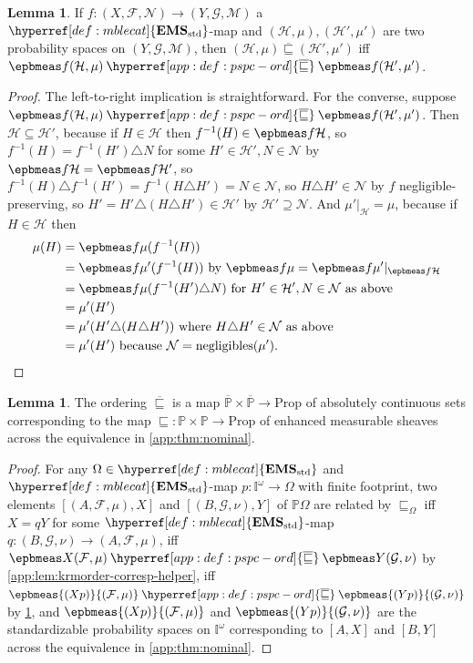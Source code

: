 \documentclass[
  sigconf,
  screen, ]{acmart}
\theoremstyle{definition}
\newtheorem{lemma}[theorem]{Lemma}
\newcommand\calF{\mathcal F}
\newcommand\calG{\mathcal G}
\newcommand\calH{\mathcal H}
\newcommand\calM{\mathcal M}
\newcommand\calN{\mathcal N}
\newcommand\nref[2]{\hyperref[#1]{#2}} \newcommand\checkhigh{{\huge{\color{red}\textbf{TODO: check}}}}
\newcommand\negligibles{\mathrm{negligibles}}
\newcommand\texhcube{{{{\mathbb I}^\omega}}}
\newcommand\hcube{{\nref{def:hcube}{\texhcube}}}
\newcommand\texagoodname{absolutely continuous set}
\newcommand\agoodname{\texagoodname}
\newcommand\sheafcatadj{enhanced measurable}
\newcommand\texgoodsheaves{\sheafcatadj{} sheaves}
\newcommand\goodsheaves{\texgoodsheaves}
\newcommand\texStdMble{\mathbf{EMS}_{\rm std}}
\newcommand\StdMble{{\nref{def:mblecat}{\texStdMble}}}
\newcommand\Prop{{\nref{prop:ext-ren-inv-prop}{\mathrm{Prop}}}}
\newcommand\texpspcs{\mathbb P}
\newcommand\pspcs{{\nref{def:mble-pspcs}{\texpspcs}}}
\newcommand\gkrmorder{\mathbin{\nref{app:def:pspc-ord}{\overline{\sqsubseteq}}}}
\newcommand\texgpspcs{\overline{\mathbb P}}
\newcommand\gpspcs{{\nref{def:gpspcs}{\texgpspcs}}}
\newcommand\krmorder{\mathrel{\nref{app:def:mble-pspcs-ordering}{\sqsubseteq}}}
\begin{document}
\begin{lemma} \label{app:epb-resp-ord}
  If $f : (X,\calF,\calN)\to(Y,\calG,\calM)$
  a $\StdMble$-map
  and $(\calH,\mu),(\calH',\mu')$
  are two probability spaces on $(Y,\calG,\calM)$,
  then $(\calH,\mu)\gkrmorder(\calH',\mu')$
  iff $\epbmeas f{(\calH,\mu)}\gkrmorder\epbmeas f{(\calH',\mu')}$.
\end{lemma}
\begin{proof}
  The left-to-right implication is straightforward.
  For the converse, suppose
 $\epbmeas f{(\calH,\mu)}\gkrmorder\epbmeas f{(\calH',\mu')}$.
  Then $\calH\subseteq\calH'$,
  because if $H\in\calH$
  then $f^{-1}(H)\in\epbmeas f\calH$,
  so $f^{-1}(H) = f^{-1}(H')\triangle N$
  for some $H'\in\calH',N\in\calN$
  by $\epbmeas f\calH=\epbmeas f{\calH'}$,
  so $f^{-1}(H)\triangle f^{-1}(H')
  =f^{-1}(H\triangle H')=N\in\calN$,
  so $H\triangle H'\in\calN$ by $f$ negligible-preserving,
  so $H' = H'\triangle(H\triangle H')\in\calH'$
  by $\calH'\supseteq\calN$.
  And $\mu'|_\calH = \mu$,
  because if $H\in\calH$
  then \begin{align*}
    \mu(H)
     &= \epbmeas f\mu(f^{-1}(H)) \\
     &= \epbmeas f{\mu'}(f^{-1}(H)) \text{ by $\epbmeas f\mu=\epbmeas f{\mu'}|_{\epbmeas f{\calH}}$}\\
     &= \epbmeas f{\mu}(f^{-1}(H')\triangle N) \text{ for $H'\in\calH',N\in\calN$ as above} \\
     &= \mu'(H') \\
     &= \mu'(H'\triangle(H\triangle H')) \text{ where $H\triangle H'\in\calN$ as above}\\
     &= \mu'(H') \text{ because $\calN=\negligibles(\mu')$}.
  \end{align*}
\end{proof}

\begin{lemma} \label{app:lem:krmorder-corresp}
  The ordering $\gkrmorder$
  is a map $\gpspcs\times\gpspcs\to\Prop$
  of \agoodname{s}
  corresponding to 
  the map $\krmorder : \pspcs\times\pspcs\to\Prop$
  of \goodsheaves{}
  across the equivalence in \cref{app:thm:nominal}.
\end{lemma}
\begin{proof}
  For any $\Omega\in\StdMble$
  and $\StdMble$-map $p : \hcube\to\Omega$ with finite footprint,
  two elements $[(A,\calF,\mu),X]$
  and $[(B, \calG,\nu), Y]$ of $\pspcs\Omega$
  are related by $\krmorder_\Omega$
  iff $X = qY$ for some $\StdMble$-map $q : (B,\calG,\nu)\to(A,\calF,\mu)$,
  iff $\epbmeas X{(\calF,\mu)} \gkrmorder \epbmeas Y{(\calG,\nu)}$ by \cref{app:lem:krmorder-corresp-helper},
  iff $\epbmeas{(Xp)}{(\calF,\mu)} \gkrmorder \epbmeas{(Yp)}{(\calG,\nu)}$ by \cref{app:epb-resp-ord},
  and $\epbmeas{(Xp)}{(\calF,\mu)}$ and $\epbmeas{(Yp)}{(\calG,\nu)}$
  are the standardizable probability spaces on $\hcube$
  corresponding to $[A,X]$ and $[B,Y]$ across the equivalence
  in \cref{app:thm:nominal}.
\end{proof}
\end{document}
